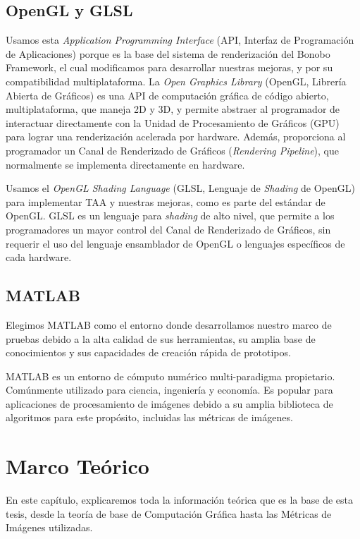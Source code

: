 \documentclass[pregrado]{tesis-usb} %
\begin{document}
\section{OpenGL y GLSL}
Usamos esta \textit{Application Programming Interface} (API, Interfaz de Programación de Aplicaciones) porque es la base del sistema de renderización del Bonobo Framework, el cual modificamos para desarrollar nuestras mejoras, y por su compatibilidad multiplataforma. La \textit{Open Graphics Library} (OpenGL, Librería Abierta de Gráficos) es una API de computación gráfica de código abierto, multiplataforma, que maneja 2D y 3D, y permite abstraer al programador de interactuar directamente con la Unidad de Procesamiento de Gráficos (GPU) para lograr una renderización acelerada por hardware. Además, proporciona al programador un Canal de Renderizado de Gráficos (\textit{Rendering Pipeline}), que normalmente se implementa directamente en hardware.

Usamos el \textit{OpenGL Shading Language} (GLSL, Lenguaje de \textit{Shading} de OpenGL) para implementar TAA y nuestras mejoras, como es parte del estándar de OpenGL. GLSL es un lenguaje para \textit{shading} de alto nivel, que permite a los programadores un mayor control del Canal de Renderizado de Gráficos, sin requerir el uso del lenguaje ensamblador de OpenGL o lenguajes específicos de cada hardware.


\section{MATLAB}
Elegimos MATLAB como el entorno donde desarrollamos nuestro marco de pruebas debido a la alta calidad de sus herramientas, su amplia base de conocimientos y sus capacidades de creación rápida de prototipos.

MATLAB es un entorno de cómputo numérico multi-paradigma propietario. Comúnmente utilizado para ciencia, ingeniería y economía. Es popular para aplicaciones de procesamiento de imágenes debido a su amplia biblioteca de algoritmos para este propósito, incluidas las métricas de imágenes.



\chapter{Marco Teórico}
En este capítulo, explicaremos toda la información teórica que es la base de esta tesis, desde la teoría de base de Computación Gráfica hasta las Métricas de Imágenes utilizadas.
\end{document}
